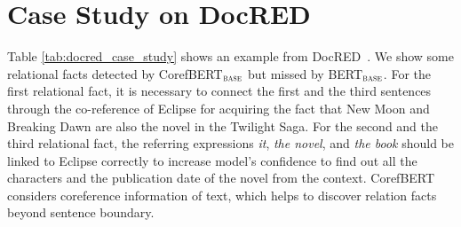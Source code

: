 \documentclass[11pt,a4paper]{article}
\newcommand\BASESIZE{$_{\small \textsc{base}}$\xspace}
\begin{document}
\section{Case Study on DocRED}
Table \ref{tab:docred_case_study} shows an example from DocRED~\citep{DocRED}.  We show some relational facts detected by CorefBERT\BASESIZE but missed by BERT\BASESIZE. 
For the first relational fact, it is necessary to connect the first and the third sentences through the co-reference of Eclipse for acquiring the fact that New Moon and Breaking Dawn are also the novel in the Twilight Saga. 
For the second and the third relational fact, the referring expressions \emph{it}, \emph{the novel}, and \emph{the book} should be linked to {Eclipse} correctly to increase model's confidence to find out all the characters and the publication date of the novel from the context. CorefBERT considers coreference information of text, which helps to discover relation facts beyond sentence boundary.
\end{document}
